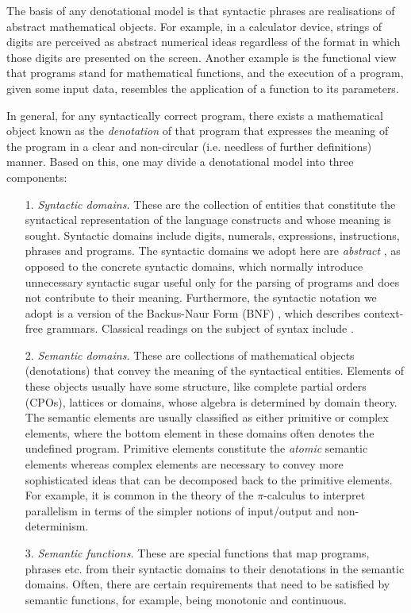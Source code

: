\documentclass[10pt,a4paper,final,oneside,fleqn]{book}
\begin{document}
The basis of any denotational model is that syntactic phrases are realisations of abstract mathematical objects.  For example, in a calculator device, strings of digits are perceived as abstract numerical ideas regardless of the format in which those digits are presented on the screen.  Another example is the functional view that programs stand for mathematical functions, and the execution of a program, given some input data, resembles the application of a function to its parameters.

In general, for any syntactically correct program, there exists a mathematical object known as the {\itshape denotation\/} of that program that expresses the meaning of the program in a clear and non-circular (i.e. needless of further definitions) manner.  Based on this, one may divide a denotational model into three components:
\begin{itemize}
\item[1.]
{\itshape Syntactic domains.\/}  These are the collection of entities that constitute the syntactical representation of the language constructs and whose meaning is sought.  Syntactic domains include digits, numerals, expressions, instructions, phrases and programs.  The syntactic domains we adopt here are {\itshape abstract\/} \cite{mccarthy1}, as opposed to the concrete syntactic domains, which normally introduce unnecessary syntactic sugar useful only for the parsing of programs and does not contribute to their meaning.  Furthermore, the syntactic notation we adopt is a version of the Backus-Naur Form (BNF) \cite{naur1}, which describes context-free grammars.  Classical readings on the subject of syntax include \cite{chomsky1,backhouse1}.
\item[2.]
{\itshape Semantic domains.\/}  These are collections of mathematical objects (denotations) that convey the meaning of the syntactical entities.  Elements of these objects usually have some structure, like complete partial orders (CPOs), lattices or domains, whose algebra is determined by domain theory.  The semantic elements are usually classified as either primitive or complex elements, where the bottom element in these domains often denotes the undefined program. Primitive elements constitute the {\itshape atomic\/} semantic elements whereas complex elements are necessary to convey more sophisticated ideas that can be decomposed back to the primitive elements.  For example, it is common in the theory of the $\pi$-calculus to interpret parallelism in terms of the simpler notions of input/output and non-determinism.
\item[3.]
{\itshape Semantic functions.\/}  These are special functions that map programs, phrases etc. from their syntactic domains to their denotations in the semantic domains.  Often, there are certain requirements that need to be satisfied by semantic functions, for example, being monotonic and continuous.
\end{itemize}
\end{document}
